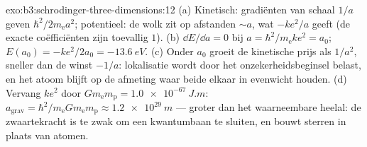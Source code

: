 \begin{solution}{exo:b3:schrodinger-three-dimensions:12}
(a) Kinetisch: gradiënten van schaal $1/a$ geven
$\hbar^2/2m_{\text{e}}
a^2$; potentieel: de wolk zit op afstanden $\sim a$, wat $-ke^2/a$ geeft (de exacte coëfficiënten zijn toevallig $1$). (b)
$\dd E/\dd
a = 0$ bij $a = \hbar^2/m_{\text{e}}ke^2 = a_0$; $E(a_0) =
-ke^2/2a_0 = \qty{-13.6}{eV}$. (c) Onder $a_0$ groeit de kinetische prijs
als $1/a^2$, sneller dan de winst $-1/a$: lokalisatie wordt door het
onzekerheidsbeginsel belast, en het atoom blijft op de afmeting waar
beide elkaar in evenwicht houden. (d) Vervang $ke^2$ door
$Gm_{\text{e}}m_{\text{p}} =
\qty{1.0e-67}{J.m}$: $a_{\text{grav}} = \hbar^2/m_{\text{e}}G
m_{\text{e}}m_{\text{p}} \approx \qty{1.2e29}{m}$
--- groter dan het waarneembare heelal: de zwaartekracht is te zwak om
een kwantumbaan te sluiten, en bouwt sterren in plaats van atomen.
\end{solution}

